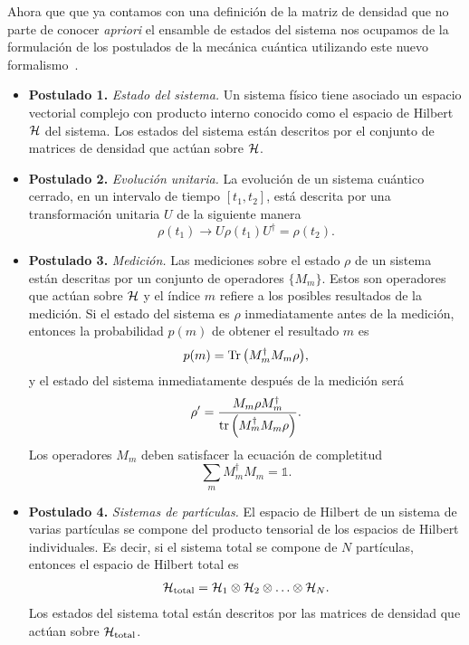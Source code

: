 Ahora que que ya contamos con una definición de la matriz de densidad 
que no parte de conocer \textit{apriori} el ensamble de estados del sistema
nos ocupamos de la formulación de los postulados de la mecánica cuántica 
utilizando este nuevo formalismo~\cite[p.~102]{nielsen_chuang_2011}.
\begin{itemize}
	\item[] \textbf{Postulado 1.} \textit{Estado del sistema.} 
	Un sistema físico tiene asociado un espacio vectorial complejo
	con producto interno conocido como el espacio de Hilbert $\mathcal{H}$ del
	sistema. Los estados del sistema están descritos por el conjunto 
	de matrices de densidad que actúan sobre $\mathcal{H}$.
	\item[] \textbf{Postulado 2.} \textit{Evolución unitaria.}
	La evolución de un sistema cuántico cerrado, en un intervalo 
	de tiempo $[t_1,t_2]$, está descrita	por una transformación unitaria $U$
	de la siguiente manera 
	\begin{equation} \label{eq:postulate-ClosedEvolution}
	\rho(t_1)\longrightarrow U\rho(t_1) U^{\dagger}=\rho(t_2).
	\end{equation}
	\item[] \textbf{Postulado 3.} \textit{Medición.}
	Las mediciones sobre el estado $\rho$ de un sistema 
	están descritas por un conjunto de operadores $\{M_m\}$. 
	Estos son operadores que actúan sobre $\mathcal{H}$ y el 
	índice $m$ refiere a los posibles
	resultados de la medición. Si el estado del sistema es $\rho$ 
	inmediatamente antes de la medición, entonces la probabilidad
	$p(m)$ de obtener el resultado $m$ es
	\begin{equation} \label{eq:post_MeasureProb}
	p(m)=\Tr \qty(M_m^{\dagger}M_m\rho),
	\end{equation}						
	y el estado del sistema inmediatamente después de la medición será
	\begin{equation} \label{eq:post_MeasureTrasnfState}
	\rho'=\frac{M_m\rho M_m^{\dagger}}{\tr \qty(M_m^{\dagger}M_m\rho)}.
	\end{equation}	
	Los operadores $M_m$ deben satisfacer la ecuación de completitud
	\begin{equation} \label{eq:post_MeasureMCompleteness}
	\sum _m M_m^{\dagger}M_m=\mathbb{1}.
	\end{equation}
	\item[] \textbf{Postulado 4.} \textit{Sistemas de partículas.}
	El espacio de Hilbert de un sistema 	de varias partículas se compone del
	producto tensorial de los espacios de Hilbert 	individuales.
	Es decir, si el sistema total se compone de $N$ partículas, 
	entonces el espacio de Hilbert total es
	\begin{align}\label{eq:postulado4}
		\mathcal{H}_{\text{total}} = \mathcal{H}_1\otimes \mathcal{H}_2 \otimes \ldots \otimes \mathcal{H}_N.
	\end{align}
	Los estados del sistema total están descritos por las matrices de 
	densidad que actúan sobre $\mathcal{H} _{\text{total}}$.
\end{itemize}

